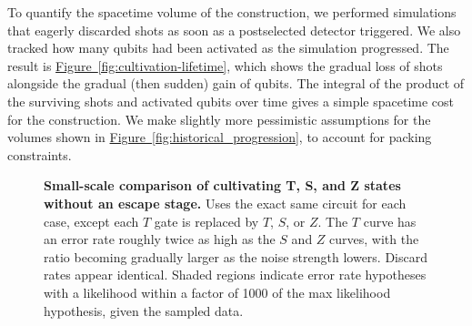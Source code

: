 \documentclass[onecolumn,unpublished,a4paper]{quantumarticle}
\theoremstyle{definition}
\newcommand{\fig}[1]{\hyperref[fig:#1]{Figure~\ref*{fig:#1}}}
\begin{document}
To quantify the spacetime volume of the construction, we performed simulations that eagerly discarded shots as soon as a postselected detector triggered.
We also tracked how many qubits had been activated as the simulation progressed.
The result is \fig{cultivation-lifetime}, which shows the gradual loss of shots alongside the gradual (then sudden) gain of qubits.
The integral of the product of the surviving shots and activated qubits over time gives a simple spacetime cost for the construction.
We make slightly more pessimistic assumptions for the volumes shown in \fig{historical_progression}, to account for packing constraints.

\begin{figure}
    \begin{adjustwidth}{-1.5cm}{-1.5cm}
        \centering
    \end{adjustwidth}
    \caption{
        \textbf{Small-scale comparison of cultivating T, S, and Z states without an escape stage.}
        Uses the exact same circuit for each case, except each $T$ gate is replaced by $T$, $S$, or $Z$.
        The $T$ curve has an error rate roughly twice as high as the $S$ and $Z$ curves, with the ratio becoming gradually larger as the noise strength lowers.
        Discard rates appear identical.
        Shaded regions indicate error rate hypotheses with a likelihood within a factor of 1000 of the max likelihood hypothesis, given the sampled data.
    }
    \label{fig:t-vs-s}
\end{figure}
\end{document}
